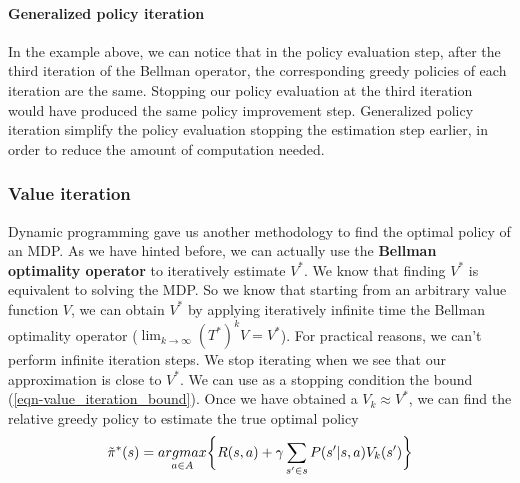 \documentclass[main.tex]{subfiles}
\begin{document}
\paragraph{Generalized policy iteration} In the example above, we can notice that in the policy evaluation step, after the third iteration of the Bellman operator, the corresponding greedy policies of each iteration are the same. Stopping our policy evaluation at the third iteration would have produced the same policy improvement step. Generalized policy iteration simplify the policy evaluation stopping the estimation step earlier, in order to reduce the amount of computation needed.

\subsubsection{Value iteration}
Dynamic programming gave us another methodology to find the optimal policy of an MDP. As we have hinted before, we can actually use the \textbf{Bellman optimality operator} to iteratively estimate $V^*$. We know that finding $V^*$ is equivalent to solving the MDP. So we know that starting from an arbitrary value function $V$, we can obtain $V^*$ by applying iteratively infinite time the Bellman optimality operator ($\lim_{k \rightarrow \infty} (T^*)^k V = V^*$).
For practical reasons, we can't perform infinite iteration steps. We stop iterating when we see that our approximation is close to $V^*$. We can use as a stopping condition the bound (\ref{eqn-value_iteration_bound}).
\newline
Once we have obtained a $V_k \approx V^*$, we can find the relative greedy policy to estimate the true optimal policy
\begin{equation}
    \Tilde{\pi}^*(s) = \underset{a \in A}{argmax} \bigg\{ R(s,a) + \gamma \sum_{s' \in s} P(s'|s,a) V_k(s') \bigg\}
\end{equation}

\newpage
\end{document}
